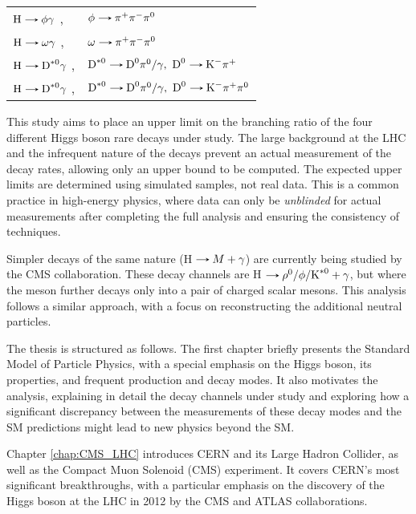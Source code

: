 \begin{table}[!ht]
    \centering
    \begin{tabular}{ll}
        $\text{H}\decaysto \phi\gamma$ ,& $\phi\decaysto \pi^+\pi^-\pi^0$ \\
        $\text{H}\decaysto \omega\gamma$ ,& $\omega\decaysto \pi^+\pi^-\pi^0$\\
        $\text{H}\decaysto \text{D}^{*0}\gamma$ ,& $\text{D}^{*0}\decaysto \text{D}^{0}\pi^{0}/\gamma,\ \text{D}^{0}\decaysto \text{K}^{-}\pi^{+}$\\
        $\text{H}\decaysto \text{D}^{*0}\gamma$ ,& $\text{D}^{*0}\decaysto \text{D}^{0}\pi^{0}/\gamma,\ \text{D}^{0}\decaysto \text{K}^{-}\pi^{+}\pi^{0}$
    \end{tabular}
\end{table}
\newpage
This study aims to place an upper limit on the branching ratio of the four different Higgs boson rare decays under study. The large background at the LHC and the infrequent nature of the decays prevent an actual measurement of the decay rates, allowing only an upper bound to be computed. The expected upper  limits are determined using simulated samples, not real data. This is a common practice in high-energy physics, where data can only be \textit{unblinded} for actual measurements after completing the full analysis and ensuring the consistency of techniques.

Simpler decays of the same nature (H$\decaysto M + \gamma$) are currently being studied by the CMS collaboration. These decay channels are H$\decaysto \rho^0/\phi/\text{K}^{*0} + \gamma$, but where the meson further decays only into a pair of charged scalar mesons. This analysis follows a similar approach, with a focus on reconstructing the additional neutral particles.

The thesis is structured as follows. The first chapter briefly presents the Standard Model of Particle Physics, with a special emphasis on the Higgs boson, its properties, and frequent production and decay modes. It also motivates the analysis, explaining in detail the decay channels under study and exploring how a significant discrepancy between the measurements of these decay modes and the SM predictions might lead to new physics beyond the SM.

Chapter \ref{chap:CMS_LHC} introduces CERN and its Large Hadron Collider, as well as the Compact Muon Solenoid (CMS) experiment. It covers CERN's most significant breakthroughs, with a particular emphasis on the discovery of the Higgs boson at the LHC in 2012 by the CMS and ATLAS collaborations.

